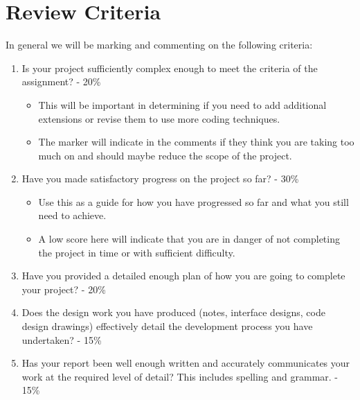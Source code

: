 \section*{Review Criteria}
In general we will be marking and commenting on the following criteria:
\begin{enumerate}
\item Is your project sufficiently complex enough to meet the criteria of the assignment? - 20\%
  \begin{itemize}
    \item This will be important in determining if you need to add additional extensions or revise them to use more coding techniques.
    \item The marker will indicate in the comments if they think you are taking too much on and should maybe reduce the scope of the project. 
  \end{itemize}
\item Have you made satisfactory progress on the project so far? - 30\% 
  \begin{itemize}
    \item Use this as a guide for how you have progressed so far and what you still need to achieve.
    \item A low score here will indicate that you are in danger of not completing the project in time or with sufficient difficulty.
  \end{itemize}
\item Have you provided a detailed enough plan of how you are going to complete your project? - 20\%
\item Does the design work you have produced (notes, interface designs, code design drawings) effectively detail the development process you have undertaken? - 15\%
\item Has your report been well enough written and accurately communicates your work at the required level of detail? This includes spelling and grammar. - 15\%
\end{enumerate}
